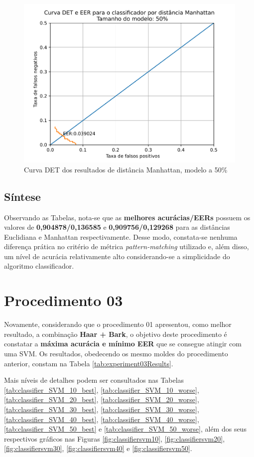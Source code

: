 			\begin{figure}[!ht]
				\centering
				\includegraphics[width=.6\linewidth]{images/results/det/DET_for_classifier_Manhattan_50}
				\caption{Curva DET dos resultados de distância Manhattan, modelo a 50\%}
				\label{fig:detforclassifiermanhattan50}
			\end{figure}
		
			\FloatBarrier
		\subsection{Síntese}
			\par Observando as Tabelas, nota-se que as \textbf{melhores acurácias/EERs} possuem os valores de \textbf{0,904878/0,136585} e \textbf{0,909756/0,129268} para as distâncias Euclidiana e Manhattan respectivamente. Desse modo, constata-se nenhuma diferença prática no critério de métrica \textit{pattern-matching} utilizado e, além disso, um nível de acurácia relativamente alto considerando-se a simplicidade do algoritmo classificador.

	\section{Procedimento 03}
		\label{chap:testsResults:sec:Experimento03}
		\par Novamente, considerando que o procedimento 01 apresentou, como melhor resultado, a combinação \textbf{Haar + Bark}, o objetivo deste procedimento é constatar a \textbf{máxima acurácia e mínimo EER} que se consegue atingir com uma SVM. Os resultados, obedecendo os mesmo moldes do procedimento anterior, constam na Tabela \ref{tab:experiment03Results}.
		
		\par Mais níveis de detalhes podem ser consultados nas Tabelas \ref{tab:classifier_SVM_10_best}, \ref{tab:classifier_SVM_10_worse}, \ref{tab:classifier_SVM_20_best}, \ref{tab:classifier_SVM_20_worse}, \ref{tab:classifier_SVM_30_best}, \ref{tab:classifier_SVM_30_worse}, \ref{tab:classifier_SVM_40_best}, \ref{tab:classifier_SVM_40_worse}, \ref{tab:classifier_SVM_50_best} e \ref{tab:classifier_SVM_50_worse}, além dos seus respectivos gráficos nas Figuras \ref{fig:classifiersvm10}, \ref{fig:classifiersvm20}, \ref{fig:classifiersvm30}, \ref{fig:classifiersvm40} e \ref{fig:classifiersvm50}.

